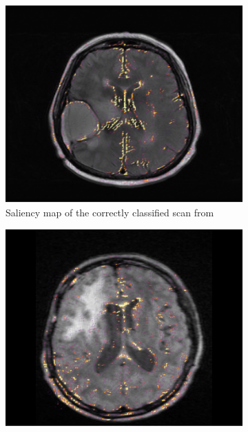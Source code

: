 \begin{figure}
    \begin{subfigure}[t]{0.25\textwidth}
        \centering
        \includegraphics[width=\textwidth]{Figures/FLAIR_Ivy_Saliency}
        \caption{Saliency map of the correctly classified \gls{scan} from \protect{}}\label{fig:IvyGAP_FLAIR_saliency}
    \end{subfigure}
    \hfill
    \begin{subfigure}[t]{0.25\textwidth}
        \centering
        \includegraphics[width=\textwidth]{Figures/Appendix/FLAIR_RIDER_saliency}

\end{subfigure}
\end{figure}

